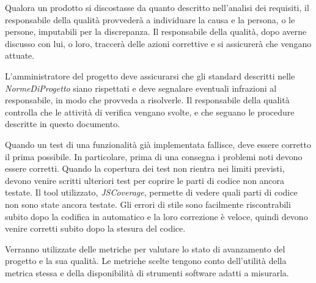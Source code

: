 Qualora un prodotto si discostasse da quanto descritto nell'analisi dei requisiti, il responsabile della qualit\`a provveder\`a a individuare la causa e la persona, o le persone, imputabili per la discrepanza. Il responsabile della qualit\`a, dopo averne discusso con lui, o loro, traccer\`a delle azioni correttive e si assicurer\`a che vengano attuate.
 
L'amministratore del progetto deve assicurarsi che gli standard descritti nelle \textit{NormeDiProgetto} siano rispettati e deve segnalare eventuali infrazioni al responsabile, in modo che provveda a risolverle. Il responsabile della qualit\`a controlla che le attivit\`a di verifica vengano svolte, e che seguano le procedure descritte in questo documento.
\newpage
 
Quando un test di una funzionalit\`a gi\`a implementata fallisce, deve essere corretto il prima possibile. In particolare, prima di una consegna i problemi noti devono essere corretti.
Quando la copertura dei test non rientra nei limiti previsti, devono venire scritti ulteriori test per coprire le parti di codice non ancora testate. Il tool utilizzato, \textit{JSCoverage}, permette di vedere quali parti di codice non sono state ancora testate.
Gli errori di stile sono facilmente riscontrabili subito dopo la codifica in automatico e la loro correzione \`e veloce, quindi devono venire corretti subito dopo la stesura del codice.

Verranno utilizzate delle metriche per valutare lo stato di avanzamento del progetto e la sua qualit\`a. 
Le metriche scelte tengono conto dell'utilit\`a della metrica stessa e della disponibilit\`a di strumenti software
adatti a misurarla.

